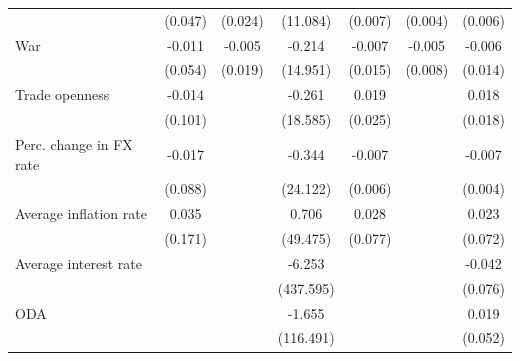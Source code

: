 \begin{table}[htbp]
\begin{tabular}{lcccccc}
                                 & (0.047)                              & (0.024)                            & (11.084)    & (0.007)     & (0.004)     & (0.006)\\   
      War                        & -0.011                               & -0.005                             & -0.214      & -0.007      & -0.005      & -0.006\\   
                                 & (0.054)                              & (0.019)                            & (14.951)    & (0.015)     & (0.008)     & (0.014)\\   
      Trade openness             & -0.014                               &                                    & -0.261      & 0.019       &             & 0.018\\   
                                 & (0.101)                              &                                    & (18.585)    & (0.025)     &             & (0.018)\\   
      Perc. change in FX rate    & -0.017                               &                                    & -0.344      & -0.007      &             & -0.007\\   
                                 & (0.088)                              &                                    & (24.122)    & (0.006)     &             & (0.004)\\   
      Average inflation rate     & 0.035                                &                                    & 0.706       & 0.028       &             & 0.023\\   
                                 & (0.171)                              &                                    & (49.475)    & (0.077)     &             & (0.072)\\   
      Average interest rate      &                                      &                                    & -6.253      &             &             & -0.042\\   
                                 &                                      &                                    & (437.595)   &             &             & (0.076)\\   
      ODA                        &                                      &                                    & -1.655      &             &             & 0.019\\   
                                 &                                      &                                    & (116.491)   &             &             & (0.052)\\   

\end{tabular}
\end{table}
